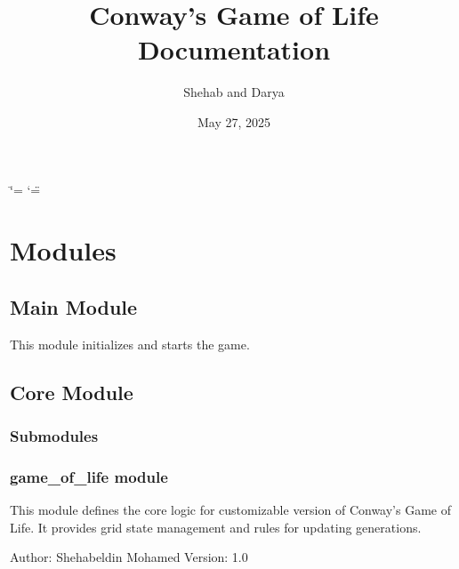 \documentclass[letterpaper,10pt,oneside,english]{sphinxhowto}
\title{Conway's Game of Life Documentation}
\date{May 27, 2025}
\author{Shehab and Darya}
\begin{document}
\ifdefined\shorthandoff
  \ifnum\catcode`\=\string=\active\shorthandoff{=}\fi
  \ifnum\catcode`\"=\active{}\fi
\fi

\pagestyle{empty}
\sphinxmaketitle
\pagestyle{plain}
\sphinxtableofcontents
\pagestyle{normal}
\label{\detokenize{index::doc}}


\clearpage


\section{Modules}
\label{\detokenize{index:modules}}
\sphinxstepscope


\subsection{Main Module}
\label{\detokenize{main:main-module}}\label{\detokenize{main::doc}}
\sphinxAtStartPar
This module initializes and starts the game.
\label{\detokenize{main:module-main}}
\sphinxstepscope


\subsection{Core Module}
\label{\detokenize{core:core-module}}\label{\detokenize{core::doc}}

\subsubsection{Submodules}
\label{\detokenize{core:submodules}}

\subsubsection{game\_of\_life module}
\label{\detokenize{core:module-core.game_of_life}}\label{\detokenize{core:game-of-life-module}}
\sphinxAtStartPar
This module defines the core logic for customizable version of Conway’s Game of Life.
It provides grid state management and rules for updating generations.

\sphinxAtStartPar
Author: Shehabeldin Mohamed
Version: 1.0
\end{document}
